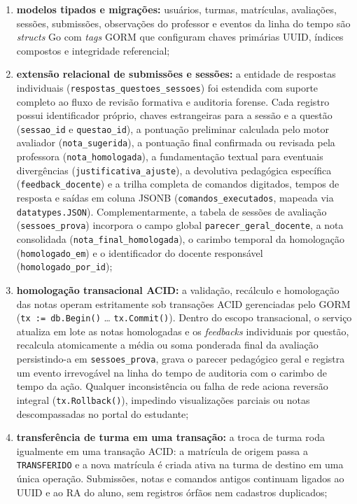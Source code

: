 \begin{enumerate}
    \item \textbf{modelos tipados e migrações:} usuários, turmas, matrículas, avaliações, sessões, submissões, observações do professor e eventos da linha do tempo são \textit{structs} Go com \textit{tags} GORM que configuram chaves primárias UUID, índices compostos e integridade referencial;

    \item \textbf{extensão relacional de submissões e sessões:} a entidade de respostas individuais (\texttt{respostas\_questoes\_sessoes}) foi estendida com suporte completo ao fluxo de revisão formativa e auditoria forense. Cada registro possui identificador próprio, chaves estrangeiras para a sessão e a questão (\texttt{sessao\_id} e \texttt{questao\_id}), a pontuação preliminar calculada pelo motor avaliador (\texttt{nota\_sugerida}), a pontuação final confirmada ou revisada pela professora (\texttt{nota\_homologada}), a fundamentação textual para eventuais divergências (\texttt{justificativa\_ajuste}), a devolutiva pedagógica específica (\texttt{feedback\_docente}) e a trilha completa de comandos digitados, tempos de resposta e saídas em coluna JSONB (\texttt{comandos\_executados}, mapeada via \texttt{datatypes.JSON}). Complementarmente, a tabela de sessões de avaliação (\texttt{sessoes\_prova}) incorpora o campo global \texttt{parecer\_geral\_docente}, a nota consolidada (\texttt{nota\_final\_homologada}), o carimbo temporal da homologação (\texttt{homologado\_em}) e o identificador do docente responsável (\texttt{homologado\_por\_id});

    \item \textbf{homologação transacional ACID:} a validação, recálculo e homologação das notas operam estritamente sob transações ACID gerenciadas pelo GORM (\texttt{tx := db.Begin()} \ldots{} \texttt{tx.Commit()}). Dentro do escopo transacional, o serviço atualiza em lote as notas homologadas e os \textit{feedbacks} individuais por questão, recalcula atomicamente a média ou soma ponderada final da avaliação persistindo-a em \texttt{sessoes\_prova}, grava o parecer pedagógico geral e registra um evento irrevogável na linha do tempo de auditoria com o carimbo de tempo da ação. Qualquer inconsistência ou falha de rede aciona reversão integral (\texttt{tx.Rollback()}), impedindo visualizações parciais ou notas descompassadas no portal do estudante;

    \item \textbf{transferência de turma em uma transação:} a troca de turma roda igualmente em uma transação ACID: a matrícula de origem passa a \texttt{TRANSFERIDO} e a nova matrícula é criada ativa na turma de destino em uma única operação. Submissões, notas e comandos antigos continuam ligados ao UUID e ao RA do aluno, sem registros órfãos nem cadastros duplicados;


\end{enumerate}
